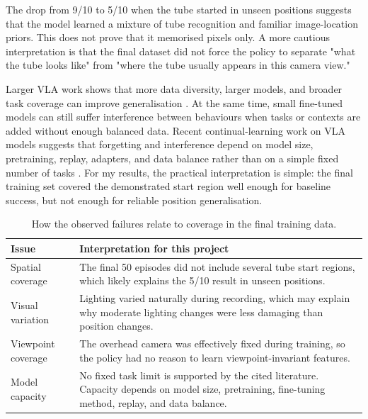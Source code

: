 \documentclass[11pt, a4paper]{article}
\begin{document}
The drop from 9/10 to 5/10 when the tube started in unseen positions suggests that the model learned a mixture of tube recognition and familiar image-location priors. This does not prove that it memorised pixels only. A more cautious interpretation is that the final dataset did not force the policy to separate "what the tube looks like" from "where the tube usually appears in this camera view."

Larger VLA work shows that more data diversity, larger models, and broader task coverage can improve generalisation \parencite{brohan2023rt1, zitkovich2023rt2}. At the same time, small fine-tuned models can still suffer interference between behaviours when tasks or contexts are added without enough balanced data. Recent continual-learning work on VLA models suggests that forgetting and interference depend on model size, pretraining, replay, adapters, and data balance rather than on a simple fixed number of tasks \parencite{liu2026forgetting, romer2026clare}. For my results, the practical interpretation is simple: the final training set covered the demonstrated start region well enough for baseline success, but not enough for reliable position generalisation.

\begin{table}[H]
\centering
\renewcommand{\arraystretch}{1.3}
\begin{tabular}{@{}p{}p{}@{}}
\toprule
\textbf{Issue} & \textbf{Interpretation for this project} \\ \midrule
Spatial coverage & The final 50 episodes did not include several tube start regions, which likely explains the 5/10 result in unseen positions. \\
Visual variation & Lighting varied naturally during recording, which may explain why moderate lighting changes were less damaging than position changes. \\
Viewpoint coverage & The overhead camera was effectively fixed during training, so the policy had no reason to learn viewpoint-invariant features. \\
Model capacity & No fixed task limit is supported by the cited literature. Capacity depends on model size, pretraining, fine-tuning method, replay, and data balance. \\ \bottomrule
\end{tabular}
\caption{How the observed failures relate to coverage in the final training data.}
\label{tab:coverage-analysis}
\end{table}
\end{document}
